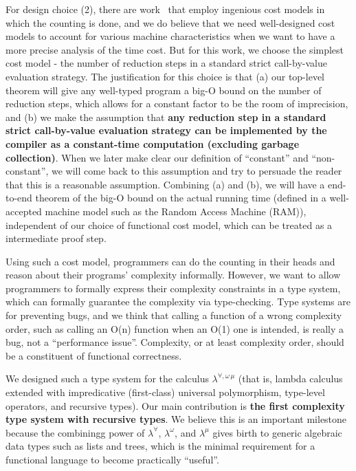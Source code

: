 \documentclass[preprint]{sigplanconf}
\begin{document}
For design choice (2), there are work~\cite{blelloch2013cache} that employ ingenious cost models in which the counting is done, and we do believe that we need well-designed cost models to account for various machine characteristics when we want to have a more precise analysis of the time cost. But for this work, we choose the simplest cost model - the number of reduction steps in a standard strict call-by-value evaluation strategy. The justification for this choice is that (a) our top-level theorem will give any well-typed program a big-O bound on the number of reduction steps, which allows for a constant factor to be the room of imprecision, and (b) we make the assumption that {\bf any reduction step in a standard strict call-by-value evaluation strategy can be implemented by the compiler as a constant-time computation (excluding garbage collection)}. When we later make clear our definition of ``constant'' and ``non-constant'', we will come back to this assumption and try to persuade the reader that this is a reasonable assumption. Combining (a) and (b), we will have a end-to-end theorem of the big-O bound on the actual running time (defined in a well-accepted machine model such as the Random Access Machine (RAM)), independent of our choice of functional cost model, which can be treated as a intermediate proof step.

Using such a cost model, programmers can do the counting in their heads and reason about their programs' complexity informally. However, we want to allow programmers to formally express their complexity constraints in a type system, which can formally guarantee the complexity via type-checking. Type systems are for preventing bugs, and we think that calling a function of a wrong complexity order, such as calling an O(n) function when an O(1) one is intended, is really a bug, not a ``performance issue''. Complexity, or at least complexity order, should be a constituent of functional correctness.

We designed such a type system for the calculus $\lambda^{\forall,\omega\,\mu}$ (that is, lambda calculus extended with impredicative (first-class) universal polymorphism, type-level operators, and recursive types). Our main contribution is {\bf the first complexity type system with recursive types}. We believe this is an important milestone because the combiningg power of $\lambda^\forall$, $\lambda^\omega$, and $\lambda^\mu$ gives birth to generic algebraic data types such as lists and trees, which is the minimal requirement for a functional language to become practically ``useful''.
\end{document}
